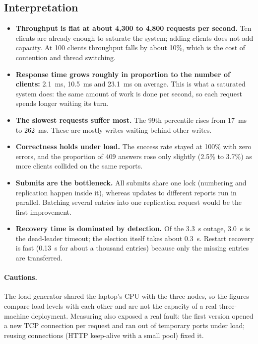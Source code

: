\documentclass[10pt,a4paper]{article}
\begin{document}
\subsection{Interpretation}

\begin{itemize}
\item \textbf{Throughput is flat at about 4,300 to 4,800 requests per second.} Ten clients are
already enough to saturate the system; adding clients does not add capacity. At 100 clients
throughput falls by about 10\%, which is the cost of contention and thread switching.
\item \textbf{Response time grows roughly in proportion to the number of clients:} 2.1~ms,
10.5~ms and 23.1~ms on average. This is what a saturated system does: the same amount of work is
done per second, so each request spends longer waiting its turn.
\item \textbf{The slowest requests suffer most.} The 99th percentile rises from 17~ms to 262~ms.
These are mostly writes waiting behind other writes.
\item \textbf{Correctness holds under load.} The success rate stayed at 100\% with zero errors,
and the proportion of 409 answers rose only slightly (2.5\% to 3.7\%) as more clients collided on
the same reports.
\item \textbf{Submits are the bottleneck.} All submits share one lock (numbering and replication
happen inside it), whereas updates to different reports run in parallel. Batching several entries
into one replication request would be the first improvement.
\item \textbf{Recovery time is dominated by detection.} Of the 3.3~s outage, 3.0~s is the
dead-leader timeout; the election itself takes about 0.3~s. Restart recovery is fast (0.13~s for
about a thousand entries) because only the missing entries are transferred.
\end{itemize}

\paragraph{Cautions.} The load generator shared the laptop's CPU with the three nodes, so the
figures compare load levels with each other and are not the capacity of a real three-machine
deployment. Measuring also exposed a real fault: the first version opened a new TCP connection per
request and ran out of temporary ports under load; reusing connections (HTTP keep-alive with a
small pool) fixed it.
\end{document}
